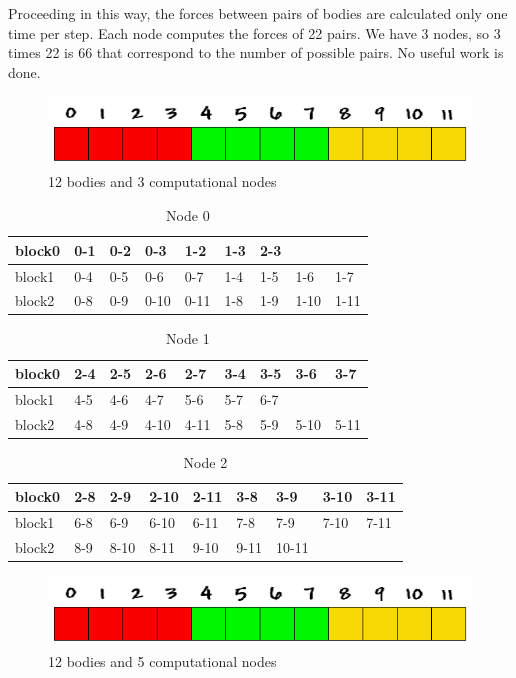 \documentclass[a4paper]{article}
\begin{document}
Proceeding in this way, the forces between pairs of bodies are calculated only one time per step. Each node computes the forces of 22 pairs. We have 3 nodes, so 3 times 22 is 66 that correspond to the number of possible pairs. No useful work is done.


\begin{figure}[ht]
  \centering\includegraphics[width=0.6\linewidth]{array_procs_3}
  \caption{12 bodies and 3 computational nodes}
  \label{fig:3nodes}
\end{figure}
\FloatBarrier

\begin{table}[]
\centering
\caption{Node 0}
\label{my-label}
\begin{tabular}{l|llllllll}
block0 & 0-1 & 0-2 & 0-3  & 1-2  & 1-3 & 2-3 &      &      \\ \hline
block1 & 0-4 & 0-5 & 0-6  & 0-7  & 1-4 & 1-5 & 1-6  & 1-7  \\ \hline
block2 & 0-8 & 0-9 & 0-10 & 0-11 & 1-8 & 1-9 & 1-10 & 1-11
\end{tabular}
\end{table}

\begin{table}[]
\centering
\caption{Node 1}
\label{my-label}
\begin{tabular}{l|llllllll}
block0 & 2-4 & 2-5 & 2-6  & 2-7  & 3-4 & 3-5 & 3-6  & 3-7  \\ \hline
block1 & 4-5 & 4-6 & 4-7  & 5-6  & 5-7 & 6-7 &      &      \\ \hline
block2 & 4-8 & 4-9 & 4-10 & 4-11 & 5-8 & 5-9 & 5-10 & 5-11
\end{tabular}
\end{table}

\begin{table}[]
\centering
\caption{Node 2}
\label{my-label}
\begin{tabular}{l|llllllll}
block0 & 2-8 & 2-9  & 2-10 & 2-11 & 3-8  & 3-9   & 3-10 & 3-11 \\ \hline
block1 & 6-8 & 6-9  & 6-10 & 6-11 & 7-8  & 7-9   & 7-10 & 7-11 \\ \hline
block2 & 8-9 & 8-10 & 8-11 & 9-10 & 9-11 & 10-11 &      &     
\end{tabular}
\end{table}

\begin{figure}[ht]
  \centering\includegraphics[width=0.6\linewidth]{array_procs_3}
  \caption{12 bodies and 5 computational nodes}
  \label{fig:5nodes}
\end{figure}
\end{document}
